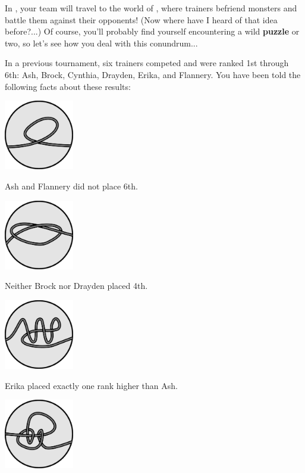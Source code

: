 

In \phEventName{}, your team will travel to the world of
\textbf{\mappMobimon{}}, where trainers befriend monsters and battle them
against their opponents!
(Now where have I heard of that idea before?...) Of course, you'll probably
find yourself encountering a wild \textbf{puzzle} or two, so let's see how
you deal with this conundrum...

In a previous \mappMobimon{} tournament, six trainers competed and were
ranked 1st through 6th: Ash, Brock, Cynthia, Drayden, Erika, and Flannery.
You have been told the following facts about these results:

\begin{multicols}{3}\footnotesize
  \begin{center}
    \includegraphics[width=1.2in]{assets/unknot1.pdf}

    Ash and Flannery did not place 6th.


    \includegraphics[width=1.2in]{assets/knot1.pdf}

    Neither Brock nor Drayden placed 4th.


    \includegraphics[width=1.2in]{assets/unknot2.pdf}

    Erika placed exactly one rank higher than Ash.


    \includegraphics[width=1.2in]{assets/knot2.pdf}


\end{center}
\end{multicols}
